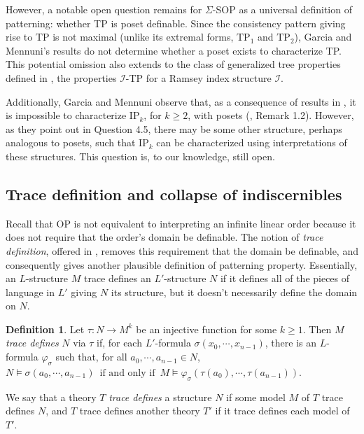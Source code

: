 \documentclass{article}
\newcommand{\calI}{\mathcal{I}}
\newcommand{\TPi}{\text{TP}_1}
\newcommand{\TPii}{\text{TP}_2}
\newcommand{\IFF}{\enspace\text{if and only if}\enspace}
\newcommand{\vphi}{\varphi}
\theoremstyle{definition}
\newtheorem{definition}{Definition}
\theoremstyle{definition}
\theoremstyle{definition}
\begin{document}
However, a notable open question remains for $\Sigma$-SOP as a universal definition of patterning: whether TP is poset definable. Since the consistency pattern giving rise to TP is not maximal (unlike its extremal forms, $\TPi$ and $\TPii$), Garcia and Mennuni's results do not determine whether a poset exists to characterize TP. This potential  omission also extends to the class of generalized tree properties defined in \cite{day2025results}, the properties $\calI$-TP for a Ramsey index structure $\calI$. 


Additionally, Garcia and Mennuni observe that, as a consequence of results in \cite{chernikov2019n}, it is impossible to characterize $\text{IP}_k$, for $k\geq 2$, with posets (\cite{garcia2022model}, Remark 1.2). However, as they point out in Question 4.5, there may be some other structure, perhaps analogous to posets, such that $\text{IP}_k$ can be characterized using interpretations of these structures. This question is, to our knowledge, still open.

\subsection{Trace definition and collapse of indiscernibles}


Recall that OP is not equivalent to interpreting an infinite linear order because it does not require that the order's domain be definable. The notion of \textit{trace definition}, offered in \cite{walsberg2025trace}, removes this requirement that the domain be definable, and consequently gives another plausible definition of patterning property. Essentially, an $L$-structure $M$ trace defines an $L'$-structure $N$ if it defines all of the pieces of language in $L'$ giving $N$ its structure, but it doesn't necessarily define the domain on $N$.
\begin{definition}\label{trace defn defn}
     Let $\tau\colon N\to M^k$ be an injective function for some $k \geq 1$. Then $M$ \textit{trace defines} $N$ via $\tau$ if, for each $L'$-formula $\sigma(x_0,\dotsm, x_{n-1})$, there is an $L$-formula $\vphi_\sigma$ such that, for all $a_0,\dotsm, a_{n-1}\in N$, $N\models \sigma(a_0,\dotsm, a_{n-1}) \IFF M\models \vphi_\sigma(\tau(a_0),\dotsm,\tau(a_{n-1})).$
\end{definition}
We say that a theory $T$ \textit{trace defines} a structure $N$ if some model $M$ of $T$ trace defines $N$, and $T$ trace defines another theory $T'$ if it trace defines each model of $T'$.
\end{document}
